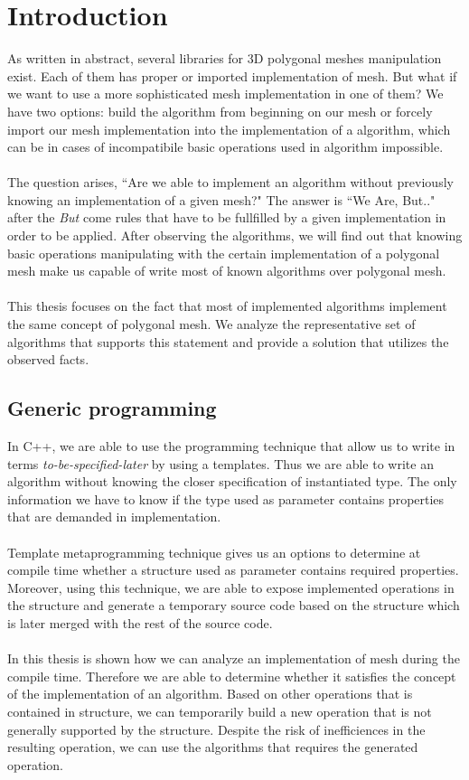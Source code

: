 \chapter*{Introduction}

As written in abstract, several libraries for 3D polygonal meshes manipulation exist.
Each of them has proper or imported implementation of mesh. But what if we want to use
a more sophisticated mesh implementation in one of them? We have two options: build
the algorithm from beginning on our mesh or forcely import our mesh implementation into
the implementation of a algorithm, which can be in cases of incompatibile basic operations
used in algorithm impossible.\\
\\
The question arises, ``Are we able to implement an algorithm without previously knowing an
implementation of a given mesh?" The answer is ``We Are, But.." after the \emph{But} come
rules that have to be fullfilled by a given implementation in order to be applied.
After observing the algorithms, we will find out that
knowing basic operations manipulating with the certain implementation of a polygonal mesh
make us capable of write most of known algorithms over polygonal mesh.\\
\\
This thesis focuses on the fact that most of implemented algorithms implement the
same concept of polygonal mesh. We analyze the representative set of algorithms that
supports this statement and provide a solution that utilizes the observed facts.

\section{Generic programming}

In C++, we are able to use the programming technique that allow us to write in terms
\emph{to-be-specified-later} by using a templates. Thus we are able to write an algorithm
without knowing the closer specification of instantiated type. The only information we have
to know if the type used as parameter contains properties that are demanded in implementation.\\
\\
Template metaprogramming technique gives us an options to determine at compile time whether
a structure used as parameter contains required properties. Moreover, using this technique,
we are able to expose implemented operations in the structure and generate a temporary source
code based on the structure which is later merged with the rest of the source code.\\
\\
In this thesis is shown how we can analyze an implementation of mesh during the compile time.
Therefore we are able to determine whether it satisfies the concept of the implementation of
an algorithm. Based on other operations that is contained in structure, we can temporarily build a new
operation that is not generally supported by the structure. Despite the risk of inefficiences in
the resulting operation, we can use the algorithms that requires the generated operation.

